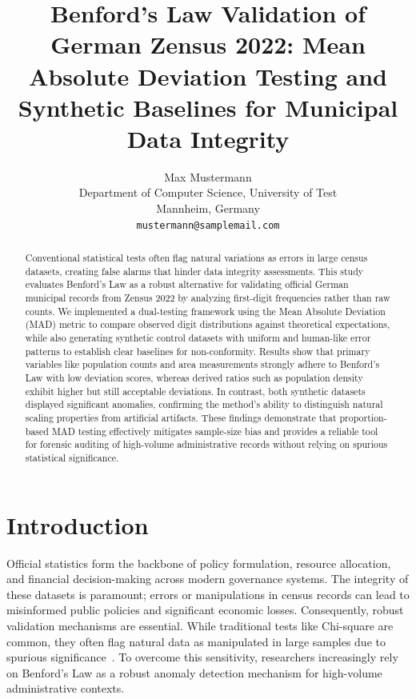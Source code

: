 \documentclass[11pt,a4paper]{article}
\title{\bfseries Benford's Law Validation of German Zensus 2022: Mean Absolute Deviation Testing and Synthetic Baselines for Municipal Data Integrity}
\author{%
Max Mustermann\\
{\small Department of Computer Science, University of Test}\\
{\small Mannheim, Germany}\\
{\small \texttt{mustermann@samplemail.com}}
}
\date{}
\begin{document}
\maketitle
\thispagestyle{empty}

\begin{abstract}
\noindent
Conventional statistical tests often flag natural variations as errors in large census datasets, creating false alarms that hinder data integrity assessments. This study evaluates Benford's Law as a robust alternative for validating official German municipal records from Zensus 2022 by analyzing first-digit frequencies rather than raw counts. We implemented a dual-testing framework using the Mean Absolute Deviation (MAD) metric to compare observed digit distributions against theoretical expectations, while also generating synthetic control datasets with uniform and human-like error patterns to establish clear baselines for non-conformity. Results show that primary variables like population counts and area measurements strongly adhere to Benford's Law with low deviation scores, whereas derived ratios such as population density exhibit higher but still acceptable deviations. In contrast, both synthetic datasets displayed significant anomalies, confirming the method's ability to distinguish natural scaling properties from artificial artifacts. These findings demonstrate that proportion-based MAD testing effectively mitigates sample-size bias and provides a reliable tool for forensic auditing of high-volume administrative records without relying on spurious statistical significance.
\end{abstract}

\section{Introduction}
Official statistics form the backbone of policy formulation, resource allocation, and financial decision-making across modern governance systems. The integrity of these datasets is paramount; errors or manipulations in census records can lead to misinformed public policies and significant economic losses. Consequently, robust validation mechanisms are essential. While traditional tests like Chi-square are common, they often flag natural data as manipulated in large samples due to spurious significance~\cite{Kossovsky2021OnTM}. To overcome this sensitivity, researchers increasingly rely on Benford's Law as a robust anomaly detection mechanism for high-volume administrative contexts.
\end{document}

